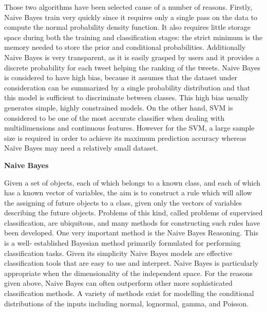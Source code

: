 Those two algorithms have been selected cause of a number of reasons. Firstly, Naive Bayes train very quickly since it requires only a single pass on the data   to compute the normal probability density function. It also requires little storage space during both the training and classification stages: the strict minimum is the memory needed to store the prior and conditional probabilities. Additionally Naive Bayes is very transparent, as it is easily grasped by users and it provides a discrete probability for each tweet helping the ranking of the tweets. Naive Bayes is considered to have high bias, because it assumes that the dataset under consideration can be summarized by a single probability distribution and that this model is sufficient to discriminate between classes. This high bias usually generates simple, highly constrained models. On the other hand, SVM is considered to be one of the most accurate classifier when dealing with multidimensions and continuous features. However for the SVM, a large sample size is required in order to achieve its maximum prediction accuracy whereas Naïve Bayes may need a relatively small dataset.

\textbf{Naive Bayes}

Given a set of objects, each of which belongs to a known class, and each of which has a known vector of variables, the aim is to construct a rule which will allow the assigning of future objects to a class, given only the vectors of variables describing the future objects. Problems of this kind, called problems of supervised classification, are ubiquitous, and many methods for constructing such rules have been developed. One very important method is the Naive Bayes Reasoning. This is a well- established Bayesian method primarily formulated for performing classification tasks. Given its simplicity Naive Bayes models are effective classification tools that are easy to use and interpret. Naive Bayes is particularly appropriate when the dimensionality of the independent space. For the reasons given above, Naive Bayes can often outperform other more sophisticated classification methods. A variety of methods exist for modelling the conditional distributions of the inputs including normal, lognormal, gamma, and Poisson. 

